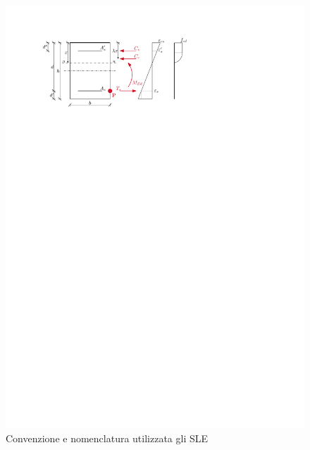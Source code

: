 \begin{figure}[htb]
    \centering
    \includegraphics[height=0.25\textheight]{IMG/IPE_slu_progetto.pdf}
    \caption{Convenzione e nomenclatura utilizzata gli SLE}
    \label{fig:sle_convenzione}
  \end{figure}
  
